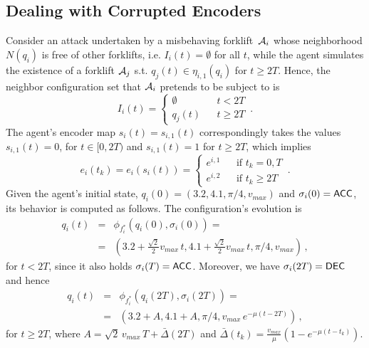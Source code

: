 \documentclass[journal, onecolumn, 12pt]{styles/IEEEtran}
\begin{document}
\subsection{Dealing with Corrupted Encoders}

Consider an attack undertaken by a misbehaving forklift~$\mathcal{A}_i$ whose neighborhood $N(q_i)$ is free of other forklifts, i.e. $I_i(t) = \emptyset$ for all $t$, while the agent simulates the existence of a forklift $\mathcal{A}_j$ s.t. $q_j(t) \in \eta_{i,1}(q_i)$ for $t \geq 2 T$. Hence, the  neighbor configuration set that $\mathcal{A}_i$ pretends to be subject to is 
$$
I_i(t) = 
\left\lbrace
\begin{array}{lll}
\emptyset & & t < 2 T \\
q_j(t) & & t \geq 2 T
\end{array}
\right.
\, .
$$
The agent's encoder map $s_i(t) = s_{i,1}(t)$ correspondingly takes the values $s_{i,1}(t) = 0$, for $t \in [0,2T)$ and $s_{i,1}(t) = 1$ for $t \geq 2T$, which implies
$$
e_i(t_k) = e_i(s_i(t)) = 
\left\lbrace
\begin{array}{ccl}
e^{i,1} & & \mbox{if } t_k = 0, T \\
e^{i,2} & & \mbox{if } t_k \geq  2T
\end{array}
\right.
\, .
$$
Given the agent's initial state, $q_i(0) = (3.2, 4.1, \pi/4, v_{max})$ and $\sigma_i(0) = \macc$, its behavior is computed as follows.  The configuration's evolution is  
$$
\begin{array}{rcl}
q_i(t) & = & \phi_{f_i^*}(q_i(0), \sigma_i(0)) = \\
& = & \left( 3.2 + \frac{\sqrt{2}}{2} v_{max} \, t, 4.1 + \frac{\sqrt{2}}{2} v_{max} \, t, \pi/4, v_{max} \right) \, ,
\end{array}
$$
for $t < 2 T$, since it also holds $\sigma_i(T) = \macc$. Moreover, we have $\sigma_i(2T) = \mdec$ and hence
$$
\begin{array}{rcl}
q_i(t) & = & \phi_{f_i^*}(q_i(2 T), \sigma_i(2 T)) = \\
& = & \left(3.2 + A, 4.1 + A, \pi/4, v_{max} \, e^{- \mu (t-2T)}  \right) \, ,
\end{array}
$$
for $t \geq 2T$, where $A = \sqrt{2} \, v_{max} \, T + \bar\Delta(2T)$ and $\bar\Delta(t_k) = \frac{v_{max}}{\mu} \left( 1 - e^{- \mu (t-t_k)} \right)$.
\end{document}
